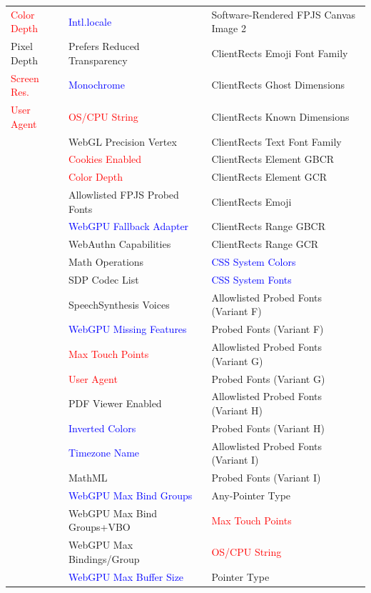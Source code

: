 {\begin{longtable}{l | l | l}
\textcolor{red}{Color Depth} & \textcolor{blue}{Intl.locale} & Software-Rendered FPJS Canvas Image 2 \\
Pixel Depth & Prefers Reduced Transparency & ClientRects Emoji Font Family \\
\textcolor{red}{Screen Res.} & \textcolor{blue}{Monochrome} & ClientRects Ghost Dimensions \\
\textcolor{red}{User Agent} & \textcolor{red}{OS/CPU String} & ClientRects Known Dimensions \\
 & WebGL Precision Vertex & ClientRects Text Font Family \\
 & \textcolor{red}{Cookies Enabled} & ClientRects Element GBCR \\
 & \textcolor{red}{Color Depth} & ClientRects Element GCR \\
 & Allowlisted FPJS Probed Fonts & ClientRects Emoji \\
 & \textcolor{blue}{WebGPU Fallback Adapter} & ClientRects Range GBCR \\
 & WebAuthn Capabilities & ClientRects Range GCR \\
 & Math Operations & \textcolor{blue}{CSS System Colors} \\
 & SDP Codec List & \textcolor{blue}{CSS System Fonts} \\
 & SpeechSynthesis Voices & Allowlisted Probed Fonts (Variant F) \\
 & \textcolor{blue}{WebGPU Missing Features} & Probed Fonts (Variant F) \\
 & \textcolor{red}{Max Touch Points} & Allowlisted Probed Fonts (Variant G) \\
 & \textcolor{red}{User Agent} & Probed Fonts (Variant G) \\
 & PDF Viewer Enabled & Allowlisted Probed Fonts (Variant H) \\
 & \textcolor{blue}{Inverted Colors} & Probed Fonts (Variant H) \\
 & \textcolor{blue}{Timezone Name} & Allowlisted Probed Fonts (Variant I) \\
 & MathML & Probed Fonts (Variant I) \\
 & \textcolor{blue}{WebGPU Max Bind Groups} & Any-Pointer Type \\
 & WebGPU Max Bind Groups+VBO & \textcolor{red}{Max Touch Points} \\
 & WebGPU Max Bindings/Group & \textcolor{red}{OS/CPU String} \\
 & \textcolor{blue}{WebGPU Max Buffer Size} & Pointer Type \\

\end{longtable}}
